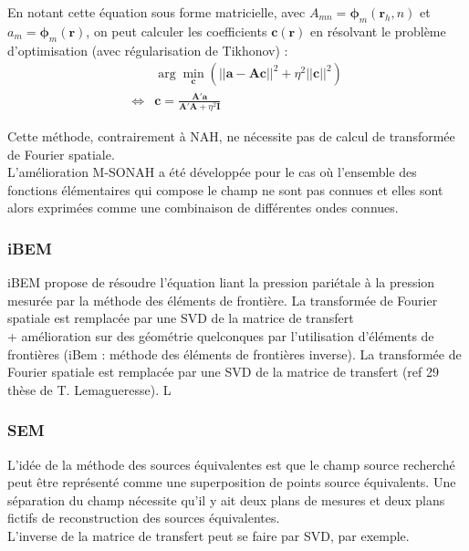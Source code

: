  En notant cette équation sous forme matricielle, avec $A_{mn} =\bm{\phi}_m(\bm{r}_h,n)$ et $a_m= \bm{\phi}_m(\bm{r})$, on peut calculer les coefficients $\bm{c}(\bm{r})$ en résolvant le problème d'optimisation (avec régularisation de Tikhonov) : 
 \begin{align}
	~& \arg\min_{\bm{c}} \left( ||\bm{a}-\bm{Ac}||^2 + \eta^2||\bm{c}||^2\right)\\
	\Leftrightarrow & \bm{c} = \frac{\bm{A}'\bm{a}}{\bm{A}'\bm{A} + \eta^2\bm{I}} 
\end{align}

 
 Cette méthode, contrairement à NAH, ne nécessite pas de calcul de transformée de Fourier spatiale.\\

 L'amélioration M-SONAH a été développée pour le cas où l'ensemble des fonctions élémentaires qui compose le champ ne sont pas connues et elles sont alors exprimées comme une combinaison de différentes ondes connues.

\subsubsection{iBEM}

iBEM propose de résoudre l'équation liant la pression pariétale à  la pression mesurée par la méthode des éléments de frontière.  La transformée de Fourier spatiale est remplacée par une SVD de la matrice de transfert\\
 

+ amélioration sur des géométrie quelconques par l'utilisation d'éléments de frontières (iBem : méthode des éléments de frontières inverse). La transformée de Fourier spatiale est remplacée par une SVD de la matrice de transfert (ref 29 thèse de T. Lemagueresse). L
\subsubsection{SEM}
L'idée de la méthode des sources équivalentes est que le champ source recherché peut être représenté comme une superposition de points source équivalents. Une séparation du champ nécessite qu'il y ait deux plans de mesures et deux plans fictifs de reconstruction des sources équivalentes.\\
L'inverse de la matrice de transfert peut se faire par SVD, par exemple.



